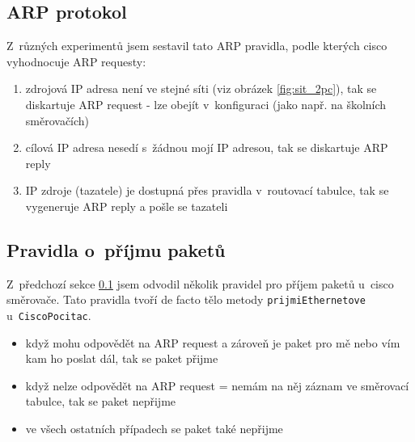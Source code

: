 

\subsection{ARP protokol} \label{arp}
\textit{} \cite{wiki:arp}

Z~různých experimentů jsem sestavil tato ARP pravidla, podle kterých cisco vyhodnocuje ARP requesty:
\begin{enumerate}
 \item zdrojová IP adresa není ve stejné síti (viz obrázek \ref{fig:sit_2pc}), tak se diskartuje ARP request - lze obejít v~konfiguraci (jako např. na školních směrovačích)
 \item cílová IP adresa nesedí s~žádnou mojí IP adresou, tak se diskartuje ARP reply
 \item IP zdroje (tazatele) je dostupná přes pravidla v~routovací tabulce, tak se vygeneruje ARP reply a pošle se tazateli
\end{enumerate}


\subsection{Pravidla o~příjmu paketů} 
Z~předchozí sekce \ref{arp} jsem odvodil několik pravidel pro příjem paketů u~cisco směrovače. Tato pravidla tvoří de facto tělo metody \verb|prijmiEthernetove| u~\verb|CiscoPocitac|.

\begin{itemize}
 \item když mohu odpovědět na ARP request a zároveň je paket pro mě nebo vím kam ho poslat dál, tak se paket přijme
 \item když nelze odpovědět na ARP request = nemám na něj záznam ve směrovací tabulce, tak se paket nepřijme
 \item ve všech ostatních případech se paket také nepřijme
\end{itemize}



